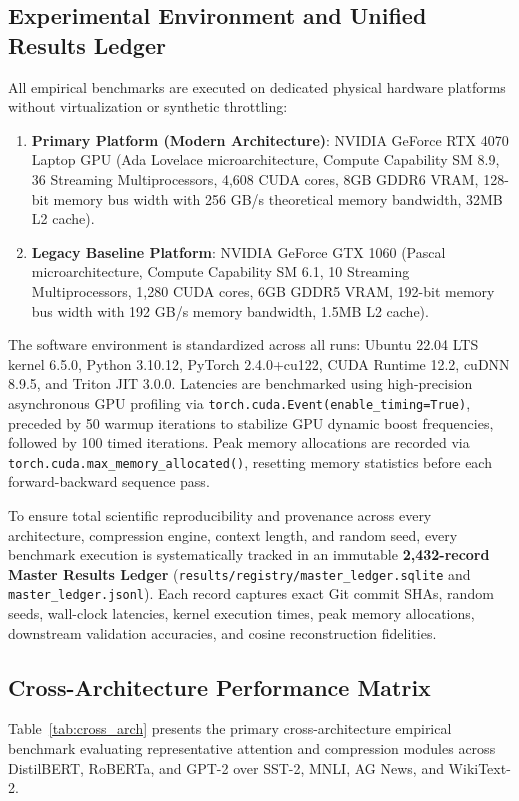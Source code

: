 \documentclass{article}
\begin{document}
\subsection{Experimental Environment and Unified Results Ledger}
All empirical benchmarks are executed on dedicated physical hardware platforms without virtualization or synthetic throttling:
\begin{enumerate}
    \item \textbf{Primary Platform (Modern Architecture)}: NVIDIA GeForce RTX 4070 Laptop GPU (Ada Lovelace microarchitecture, Compute Capability SM 8.9, 36 Streaming Multiprocessors, 4,608 CUDA cores, 8GB GDDR6 VRAM, 128-bit memory bus width with 256 GB/s theoretical memory bandwidth, 32MB L2 cache).
    \item \textbf{Legacy Baseline Platform}: NVIDIA GeForce GTX 1060 (Pascal microarchitecture, Compute Capability SM 6.1, 10 Streaming Multiprocessors, 1,280 CUDA cores, 6GB GDDR5 VRAM, 192-bit memory bus width with 192 GB/s memory bandwidth, 1.5MB L2 cache).
\end{enumerate}
The software environment is standardized across all runs: Ubuntu 22.04 LTS kernel 6.5.0, Python 3.10.12, PyTorch 2.4.0+cu122, CUDA Runtime 12.2, cuDNN 8.9.5, and Triton JIT 3.0.0. Latencies are benchmarked using high-precision asynchronous GPU profiling via \texttt{torch.cuda.Event(enable\_timing=True)}, preceded by 50 warmup iterations to stabilize GPU dynamic boost frequencies, followed by 100 timed iterations. Peak memory allocations are recorded via \texttt{torch.cuda.max\_memory\_allocated()}, resetting memory statistics before each forward-backward sequence pass.

To ensure total scientific reproducibility and provenance across every architecture, compression engine, context length, and random seed, every benchmark execution is systematically tracked in an immutable \textbf{2,432-record Master Results Ledger} (\texttt{results/registry/master\_ledger.sqlite} and \texttt{master\_ledger.jsonl}). Each record captures exact Git commit SHAs, random seeds, wall-clock latencies, kernel execution times, peak memory allocations, downstream validation accuracies, and cosine reconstruction fidelities.

\subsection{Cross-Architecture Performance Matrix}
Table~\ref{tab:cross_arch} presents the primary cross-architecture empirical benchmark evaluating representative attention and compression modules across DistilBERT, RoBERTa, and GPT-2 over SST-2, MNLI, AG News, and WikiText-2.
\end{document}
